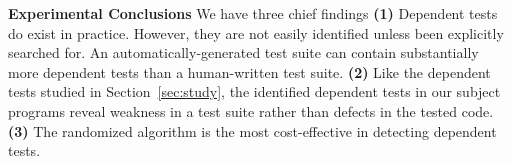 
\vspace{1mm}

\noindent \textbf{Experimental Conclusions}
We have three chief findings \textbf{(1)}
Dependent tests do exist in practice. However,
they are not easily identified
unless been explicitly searched for.
An automatically-generated test suite can contain
substantially more dependent tests than a human-written
test suite.
\textbf{(2)} Like the dependent tests
studied in Section~\ref{sec:study}, the identified
dependent tests in our subject programs reveal weakness
in a test suite rather than defects in the tested code.
\textbf{(3)} The randomized algorithm is the
most cost-effective in detecting dependent tests.


